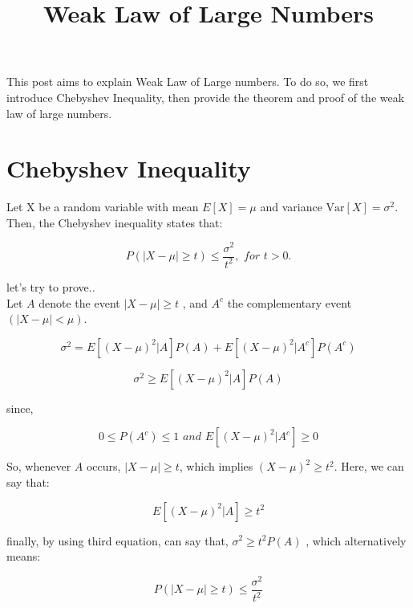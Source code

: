 \documentclass[11pt]{article}
\title{\textbf{Weak Law of Large Numbers}}
\date{}
\begin{document}
\maketitle

This post aims to explain Weak Law of Large numbers. To do so, we first introduce Chebyshev Inequality, then provide the theorem and proof of the weak law of large numbers. 

\section{Chebyshev Inequality}

Let X be a random variable with mean $E[X] = \mu$ and variance $\mathrm{Var}[X] = \sigma^2$.  Then, the Chebyshev inequality states that:

\begin{equation}
 P(|X - \mu| \geq t) \leq \frac{\sigma^2}{t^2} , \textit{ for } t > 0 .
\end{equation} 

let's try to prove.. \\

Let $A$ denote the event $|X - \mu| \geq t$ , and $A^{c}$ the complementary event $(|X - \mu| < \mu )$.

\begin{equation}
\sigma^2 = E[(X - \mu)^2|A]P(A) + E[(X - \mu)^2|A^{c}]P(A^{c}) 
\end{equation}

\begin{equation}
\sigma^2 \geq E[(X - \mu)^2|A]P(A) 
\end{equation}

since,

\begin{equation}
0 \leq P(A^{c}) \leq 1 \textit{ and } E[(X - \mu)^2|A^{c}] \geq 0
\end{equation}

So, whenever $A$ occurs, $|X - \mu| \geq t$, which implies $(X - \mu)^{2} \geq t^{2}$. Here, we can say that: 

\begin{equation}
E[(X - \mu)^2 | A] \geq t^{2} 
\end{equation}

finally, by using third equation, can say that, $\sigma^2 \geq t^2 P(A)$ , which alternatively means: 

\begin{equation}
P(|X - \mu| \geq t) \leq \frac{\sigma^2}{t^2} 
\end{equation}
\end{document}
